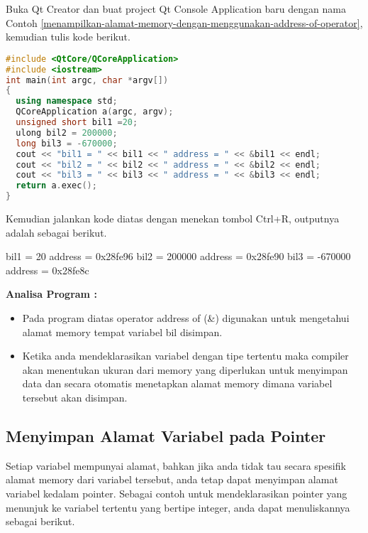 Buka Qt Creator dan buat project Qt Console Application baru dengan nama
Contoh \ref{menampilkan-alamat-memory-dengan-menggunakan-address-of-operator}, kemudian tulis kode berikut.

\begin{lstlisting}[language=c++, caption=Menampilkan alamat memory menggunakan address-of operator, label=menampilkan-alamat-memory-dengan-menggunakan-address-of-operator]
#include <QtCore/QCoreApplication>
#include <iostream>
int main(int argc, char *argv[])
{
  using namespace std;
  QCoreApplication a(argc, argv);
  unsigned short bil1 =20;
  ulong bil2 = 200000;
  long bil3 = -670000;
  cout << "bil1 = " << bil1 << " address = " << &bil1 << endl;
  cout << "bil2 = " << bil2 << " address = " << &bil2 << endl;
  cout << "bil3 = " << bil3 << " address = " << &bil3 << endl;
  return a.exec();
}
\end{lstlisting}

Kemudian jalankan kode diatas dengan menekan tombol Ctrl+R, outputnya
adalah sebagai berikut.

\begin{lcverbatim}
bil1 = 20 address = 0x28fe96 
bil2 = 200000 address = 0x28fe90 
bil3 = -670000 address = 0x28fe8c
\end{lcverbatim}

\textbf{Analisa Program :}

\begin{itemize}

\item
  Pada program diatas operator address of (\&) digunakan untuk
  mengetahui alamat memory tempat variabel bil disimpan.
\item
  Ketika anda mendeklarasikan variabel dengan tipe tertentu maka
  compiler akan menentukan ukuran dari memory yang diperlukan untuk
  menyimpan data dan secara otomatis menetapkan alamat memory dimana
  variabel tersebut akan disimpan.
\end{itemize}

\subsection{Menyimpan Alamat Variabel pada
Pointer}\label{menyimpan-alamat-variabel-pada-pointer}

Setiap variabel mempunyai alamat, bahkan jika anda tidak tau secara
spesifik alamat memory dari variabel tersebut, anda tetap dapat
menyimpan alamat variabel kedalam pointer. Sebagai contoh untuk
mendeklarasikan pointer yang menunjuk ke variabel tertentu yang bertipe
integer, anda dapat menuliskannya sebagai berikut.

